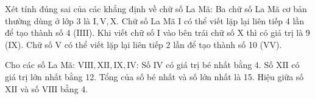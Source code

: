 \begin{ex} %
Xét tính đúng sai của các khẳng định về chữ số La Mã:
\choiceTF
{\True Ba chữ số La Mã cơ bản thường dùng ở lớp 3 là $\text{I}, \text{V}, \text{X}$.}
{Chữ số La Mã $\text{I}$ có thể viết lặp lại liên tiếp 4 lần để tạo thành số 4 ($\text{IIII}$).}
{\True Khi viết chữ số $\text{I}$ vào bên trái chữ số $\text{X}$ thì có giá trị là 9 ($\text{IX}$).}
{Chữ số $\text{V}$ có thể viết lặp lại liên tiếp 2 lần để tạo thành số 10 ($\text{VV}$).}
\end{ex}

\begin{ex} %
Cho các số La Mã: $\text{VIII}, \text{XII}, \text{IX}, \text{IV}$:
\choiceTF
{\True Số $\text{IV}$ có giá trị bé nhất bằng 4.}
{\True Số $\text{XII}$ có giá trị lớn nhất bằng 12.}
{Tổng của số bé nhất và số lớn nhất là 15.}
{\True Hiệu giữa số $\text{XII}$ và số $\text{VIII}$ bằng 4.}
\end{ex}

